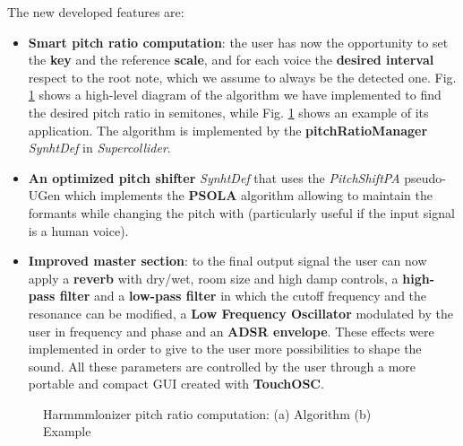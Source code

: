 \documentclass{article}
\begin{document}
The new developed features are:
\begin{itemize}
    \item \textbf{Smart pitch ratio computation}: the user has now the opportunity to set the \textbf{key} and the reference \textbf{scale}, and for each voice the \textbf{desired interval} respect to the root note, which we assume to always be the detected one. Fig. \ref{fig:PitchRatioAlg} shows a high-level diagram of the algorithm we have implemented to find the desired pitch ratio in semitones, while Fig. \ref{fig:PitchRatioAlg} shows an example of its application. The algorithm is implemented by the \textbf{pitchRatioManager} \textit{SynhtDef} in \textit{Supercollider}.
    \item \textbf{An optimized pitch shifter} \textit{SynhtDef} that uses the \textit{PitchShiftPA} pseudo-UGen which implements the \textbf{PSOLA} algorithm allowing to maintain the formants while changing the pitch with (particularly useful if the input signal is a human voice).
    \item \textbf{Improved master section}: to the final output signal the user can now apply a \textbf{reverb} with dry/wet, room size and high damp controls, a \textbf{high-pass filter} and a \textbf{low-pass filter} in which the cutoff frequency and the resonance can be modified, a \textbf{Low Frequency Oscillator} modulated by the user in frequency and phase and an \textbf{ADSR envelope}. These effects were implemented in order to give to the user more possibilities to shape the sound. All these parameters are controlled by the user through a more portable and compact GUI created with \textbf{TouchOSC}.
\end{itemize}

\begin{figure}[H]
 \centering
 \hspace{10pt}
 \caption{Harmmmlonizer pitch ratio computation: (a) Algorithm (b) Example}
 \label{fig:PitchRatioAlg}
\end{figure}
\end{document}
